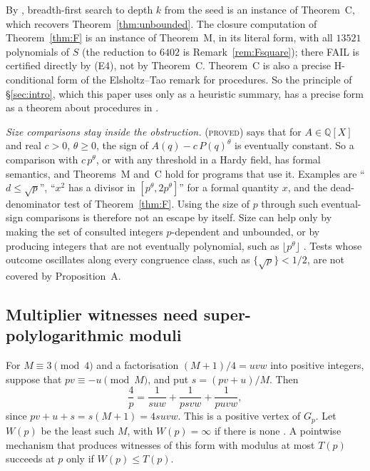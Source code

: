 \documentclass[11pt,reqno]{amsart}
\theoremstyle{definition}
\newcommand{\Q}{\mathbb Q}
\newcommand{\status}[1]{\textsc{#1}}
\begin{document}
By \cite[\S3]{PS}, breadth-first search to depth $k$ from the seed is an
instance of Theorem~C, which recovers Theorem~\ref{thm:unbounded}.  The
closure computation of Theorem~\ref{thm:F} is an instance of Theorem~M, in
its literal form, with all $13521$ polynomials of $S$ (the reduction to
$6402$ is Remark~\ref{rem:Fsquare}); there FAIL is certified directly by
(E4), not by Theorem~C.  Theorem~C is also a precise
H-conditional form of the Elsholtz--Tao remark for procedures.  So the
principle of \S\ref{sec:intro}, which this paper uses only as a heuristic
summary, has a precise form as a theorem about procedures in
\cite{PS}.

\emph{Size comparisons stay inside the obstruction.}
\cite[Proposition~A]{PS} (\status{proved}) says that for $A\in\Q[X]$ and
real $c>0$, $\theta\ge0$, the sign of $A(q)-c\,P(q)^\theta$ is eventually
constant.  So a comparison with $c\,p^\theta$, or with any threshold in a
Hardy field, has formal semantics, and Theorems~M and~C hold for programs
that use it.  Examples are ``$d\le\sqrt p$'', ``$x^2$ has a divisor in
$[p^\theta,2p^\theta]$'' for a formal quantity $x$, and the dead-denominator
test of Theorem~\ref{thm:F}.  Using the size of $p$ through such
eventual-sign comparisons is therefore not an escape by itself.  Size can
help only by making the set of consulted integers $p$-dependent and
unbounded, or by producing integers that are not eventually polynomial,
such as $\lfloor p^\theta\rfloor$ \cite[\S4.2, (E1)--(E2)]{PS}.  Tests whose
outcome oscillates along every congruence class, such as
$\{\sqrt p\}<1/2$, are not covered by Proposition~A.

\subsection{Multiplier witnesses need super-polylogarithmic moduli}
For $M\equiv3\pmod4$ and a factorisation $(M+1)/4=uvw$ into positive
integers, suppose that $pv\equiv-u\pmod M$, and put $s=(pv+u)/M$.  Then
\[
 \frac4p=\frac1{suw}+\frac1{psvw}+\frac1{puvw},
\]
since $pv+u+s=s(M+1)=4suvw$.  This is a positive vertex of $G_p$.  Let $W(p)$ be the least such $M$, with
$W(p)=\infty$ if there is none \cite[\S0]{PO}.  A pointwise mechanism that
produces witnesses of this form with modulus at most $T(p)$ succeeds at
$p$ only if $W(p)\le T(p)$.
\end{document}
